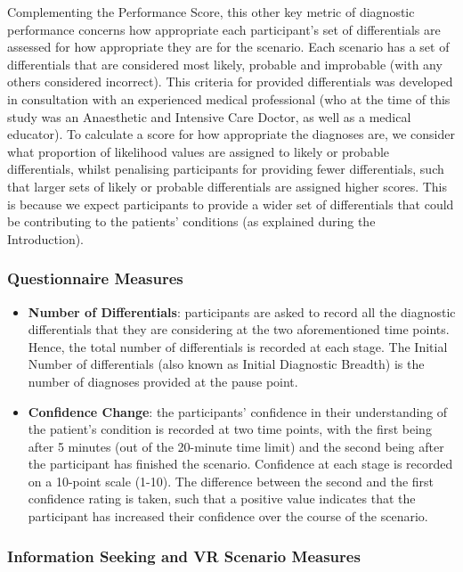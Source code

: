 \documentclass[a4paper, nobind]{templates/ociamthesis}
\begin{document}
Complementing the Performance Score, this other key metric of diagnostic performance concerns how appropriate each participant's set of differentials are assessed for how appropriate they are for the scenario. Each scenario has a set of differentials that are considered most likely, probable and improbable (with any others considered incorrect). This criteria for provided differentials was developed in consultation with an experienced medical professional (who at the time of this study was an Anaesthetic and Intensive Care Doctor, as well as a medical educator). To calculate a score for how appropriate the diagnoses are, we consider what proportion of likelihood values are assigned to likely or probable differentials, whilst penalising participants for providing fewer differentials, such that larger sets of likely or probable differentials are assigned higher scores. This is because we expect participants to provide a wider set of differentials that could be contributing to the patients' conditions (as explained during the Introduction).

\newpage

\subsubsection{Questionnaire Measures}\label{questionnaire-measures}

\begin{itemize}
\item
  \textbf{Number of Differentials}: participants are asked to record all the diagnostic differentials that they are considering at the two aforementioned time points. Hence, the total number of differentials is recorded at each stage. The Initial Number of differentials (also known as Initial Diagnostic Breadth) is the number of diagnoses provided at the pause point.
\item
  \textbf{Confidence Change}: the participants' confidence in their understanding of the patient's condition is recorded at two time points, with the first being after 5 minutes (out of the 20-minute time limit) and the second being after the participant has finished the scenario. Confidence at each stage is recorded on a 10-point scale (1-10). The difference between the second and the first confidence rating is taken, such that a positive value indicates that the participant has increased their confidence over the course of the scenario.
\end{itemize}

\subsubsection{Information Seeking and VR Scenario Measures}\label{information-seeking-and-vr-scenario-measures}
\end{document}
